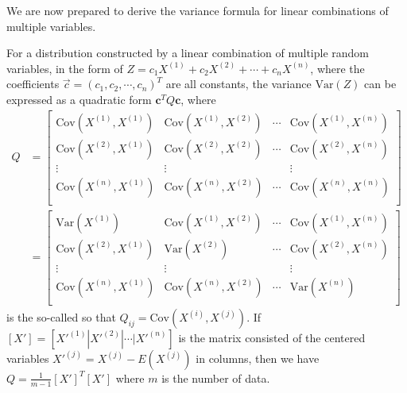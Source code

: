We are now prepared to derive the variance formula for linear combinations of multiple variables.
\begin{proper}
\label{proper:variancemul}
For a distribution constructed by a linear combination of multiple random variables, in the form of $Z = c_1X^{(1)} + c_2X^{(2)} + \cdots + c_nX^{(n)}$, where the coefficients $\vec{c} = (c_1, c_2, \cdots, c_n)^T$ are all constants, the variance $\text{Var}(Z)$ can be expressed as a quadratic form $\textbf{c}^TQ\textbf{c}$, where
\begin{subequations}
\begin{align}
Q &=
\begin{bmatrix}
\text{Cov}(X^{(1)}, X^{(1)}) & \text{Cov}(X^{(1)}, X^{(2)}) & \cdots & \text{Cov}(X^{(1)}, X^{(n)}) \\
\text{Cov}(X^{(2)}, X^{(1)}) & \text{Cov}(X^{(2)}, X^{(2)}) & \cdots & \text{Cov}(X^{(2)}, X^{(n)}) \\
\vdots & \vdots &  & \vdots \\
\text{Cov}(X^{(n)}, X^{(1)}) & \text{Cov}(X^{(n)}, X^{(2)}) & \cdots & \text{Cov}(X^{(n)}, X^{(n)}) \\
\end{bmatrix} \\
&=
\begin{bmatrix}
\text{Var}(X^{(1)}) & \text{Cov}(X^{(1)}, X^{(2)}) & \cdots & \text{Cov}(X^{(1)}, X^{(n)}) \\
\text{Cov}(X^{(2)}, X^{(1)}) & \text{Var}(X^{(2)}) & \cdots & \text{Cov}(X^{(2)}, X^{(n)}) \\
\vdots & \vdots &  & \vdots \\
\text{Cov}(X^{(n)}, X^{(1)}) & \text{Cov}(X^{(n)}, X^{(2)}) & \cdots & \text{Var}(X^{(n)}) \\
\end{bmatrix} 
\end{align}    
\end{subequations}
is the so-called  so that $Q_{ij} = \text{Cov}(X^{(i)}, X^{(j)})$. If $[X'] = [X'^{(1)}|X'^{(2)}|\cdots|X'^{(n)}]$ is the matrix consisted of the centered variables $X'^{(j)} = X^{(j)} - E(X^{(j)})$ in columns, then we have $Q = \frac{1}{m-1}[X']^T[X']$ where $m$ is the number of data.
\end{proper}
